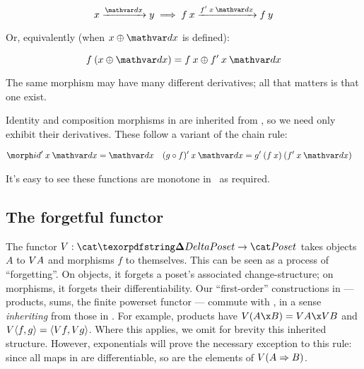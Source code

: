 \nopagebreak[2]
\[ \vld{\dx} x y \implies \vld{\deriv f\<x\<\dx}{f\<x}{f\<y}\]

\noindent Or, equivalently (when $x \upd \dx$ is defined):

\nopagebreak[2]
\[ f\<(x \upd \dx) = f\<x \upd \deriv f\<x\<\dx \]

\noindent
The same morphism may have many different derivatives; all that matters is that
one exist.

Identity and composition morphisms in \CP{} are inherited from \Poset{}, so we
need only exhibit their derivatives. These follow a variant of the chain rule:

\nopagebreak[2]
\begin{align*}
  \deriv\id \<x\<\dx &= \dx
  & \deriv{(g \circ f)} \<x\<\dx &= \deriv g \<(f\<x) \<(\deriv f\<x\<\dx)
\end{align*}

\noindent
It's easy to see these functions are monotone in \dx\ as required.


\subsection{The forgetful functor \valfn}
\label{sec:CP-vals}

The functor $\valfn : \CP \to \Poset$ takes objects $A$ to $V A$ and
morphisms $f$ to themselves. This can be seen as a process of ``forgetting''. On
objects, it forgets a poset's associated change-structure; on morphisms, it
forgets their differentiability.
%
Our ``first-order'' constructions in \CP{} --- products, sums, the finite
powerset functor --- commute with \valfn, in a sense \emph{inheriting} from
those in \Poset. For example, products have $\vals{(A \x B)} = \vals A \x \vals
B$ and $V{\langle{f,g}\rangle} = \langle{\ensuremath{V}f, \ensuremath{V}g}\rangle$.
%
Where this applies, we omit for brevity this inherited structure.
%
However, exponentials will prove the necessary exception to this rule: since all
maps in \CP{} are differentiable, so are the elements of $V{(A \Rightarrow B)}$.




